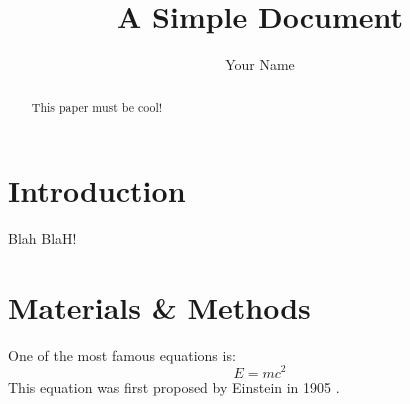 \documentclass[12pt]{article}
\title{A Simple Document}
\author{Your Name}
\date{}
\begin{document}
    \maketitle
    \begin{abstract}
        This paper must be cool!
    \end{abstract}

    \section{Introduction}
        Blah BlaH!

    \section{Materials \& Methods} 
    One of the most famous equations is:
    \begin{equation}
        E = mc^2
    \end{equation}
    This equation was first proposed by Einstein in 1905
    \cite{einstein1905does}.

    
    
\end{document}
